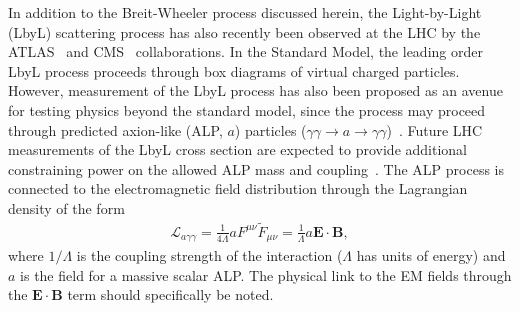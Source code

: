 \documentclass[twocolumn,epjc3]{svjour3}\sloppy
\begin{document}
In addition to the Breit-Wheeler process discussed herein, the Light-by-Light (LbyL) scattering process has also recently been observed at the LHC by the ATLAS~\cite{aaboudEvidenceLightbylightScattering2017b,atlascollaborationObservationLightbyLightScattering2019b} and CMS~\cite{sirunyanEvidenceLightbylightScattering2019a} collaborations. In the Standard Model, the leading order LbyL process proceeds through box diagrams of virtual charged particles. However, measurement of the LbyL process has also been proposed as an avenue for testing physics beyond the standard model, since the process may proceed through predicted axion-like (ALP, $a$) particles ($\gamma\gamma \rightarrow a \rightarrow \gamma\gamma$)~\cite{bauerColliderProbesAxionlike2017}. Future LHC measurements of the LbyL cross section are expected to provide additional constraining power on the allowed ALP mass and coupling~\cite{ProspectsMeasurementsPhotonInduced}. The ALP process is connected to the electromagnetic field distribution through the Lagrangian density of the form~\cite{bauerColliderProbesAxionlike2017}
\begin{align}
  \mathcal{L}_{a\gamma\gamma} = \frac{1}{4\Lambda}a F^{\mu\nu}\tilde{F}_{\mu\nu} = \frac{1}{\Lambda}a \bm{E}\cdot\bm{B},
\end{align}
where $1/\Lambda$ is the coupling strength of the interaction ($\Lambda$ has units of energy) and $a$ is the field for a massive scalar ALP. The physical link to the EM fields through the $\bm{E}\cdot\bm{B}$ term should specifically be noted. 
\end{document}
